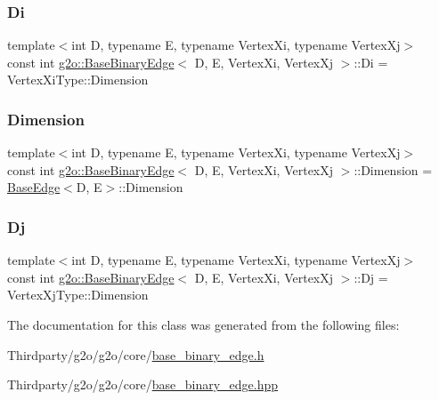 \subsubsection{\texorpdfstring{Di}{Di}}
{\footnotesize\ttfamily template$<$int D, typename E, typename Vertex\+Xi, typename Vertex\+Xj$>$ \\
const int \mbox{\hyperlink{classg2o_1_1_base_binary_edge}{g2o\+::\+Base\+Binary\+Edge}}$<$ D, E, Vertex\+Xi, Vertex\+Xj $>$\+::Di = Vertex\+Xi\+Type\+::\+Dimension\hspace{0.3cm}{\ttfamily [static]}}

\mbox{\label{classg2o_1_1_base_binary_edge_af3c134948e48c446762fa4e427d1cca5}} 
\subsubsection{\texorpdfstring{Dimension}{Dimension}}
{\footnotesize\ttfamily template$<$int D, typename E, typename Vertex\+Xi, typename Vertex\+Xj$>$ \\
const int \mbox{\hyperlink{classg2o_1_1_base_binary_edge}{g2o\+::\+Base\+Binary\+Edge}}$<$ D, E, Vertex\+Xi, Vertex\+Xj $>$\+::Dimension = \mbox{\hyperlink{classg2o_1_1_base_edge}{Base\+Edge}}$<$D, E$>$\+::Dimension\hspace{0.3cm}{\ttfamily [static]}}

\mbox{\label{classg2o_1_1_base_binary_edge_ab718b94950a34d589371fe6f5583b259}} 
\subsubsection{\texorpdfstring{Dj}{Dj}}
{\footnotesize\ttfamily template$<$int D, typename E, typename Vertex\+Xi, typename Vertex\+Xj$>$ \\
const int \mbox{\hyperlink{classg2o_1_1_base_binary_edge}{g2o\+::\+Base\+Binary\+Edge}}$<$ D, E, Vertex\+Xi, Vertex\+Xj $>$\+::Dj = Vertex\+Xj\+Type\+::\+Dimension\hspace{0.3cm}{\ttfamily [static]}}



The documentation for this class was generated from the following files\+:\begin{DoxyCompactItemize}
\item 
Thirdparty/g2o/g2o/core/\mbox{\hyperlink{base__binary__edge_8h}{base\+\_\+binary\+\_\+edge.\+h}}\item 
Thirdparty/g2o/g2o/core/\mbox{\hyperlink{base__binary__edge_8hpp}{base\+\_\+binary\+\_\+edge.\+hpp}}\end{DoxyCompactItemize}
